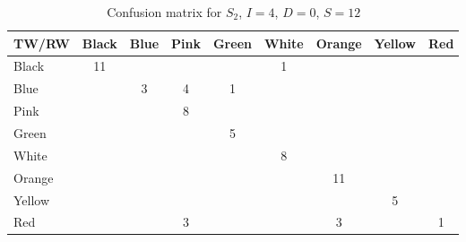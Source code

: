 \begin{table}[h!]
  \begin{tabular}{|l|*{8}{c|}}
  \hline
 TW/RW  & Black & Blue & Pink & Green & White & Orange & Yellow & Red \\
\hline
Black & 11 & & & & 1 & & &  \\	
\hline
Blue  &	& 3 & 4 & 1 & & & & \\
\hline
Pink  & & & 8 & & & & & \\
\hline				
Green & & & & 5 & & & & \\
\hline
White & & & & & 8 & & & \\
\hline
Orange & & & & & & 11 &  & 	\\
\hline
Yellow & & & & & & & 5 & \\
\hline
Red & & & 3 & & & 3 & & 1 \\
\hline
  \end{tabular}
\caption{Confusion matrix for $S_2$, $I = 4$, $D = 0$, $S=12$}
\label{tad:clem_result}
\end{table}
